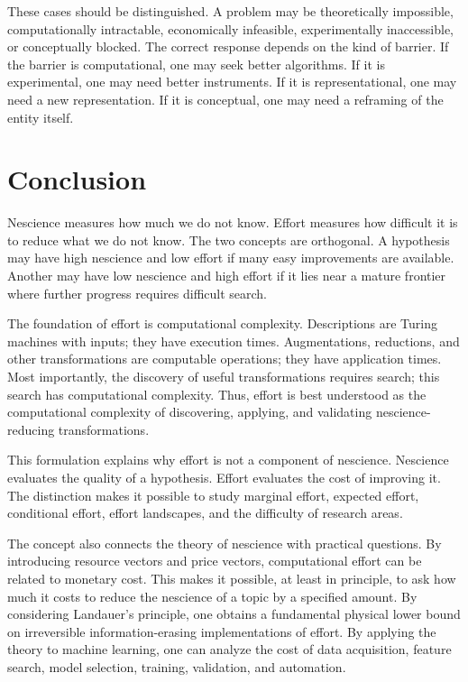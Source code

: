 These cases should be distinguished. A problem may be theoretically impossible, computationally intractable, economically infeasible, experimentally inaccessible, or conceptually blocked. The correct response depends on the kind of barrier. If the barrier is computational, one may seek better algorithms. If it is experimental, one may need better instruments. If it is representational, one may need a new representation. If it is conceptual, one may need a reframing of the entity itself.

\section{Conclusion}
\label{sec:effort_conclusion}

Nescience measures how much we do not know. Effort measures how difficult it is to reduce what we do not know. The two concepts are orthogonal. A hypothesis may have high nescience and low effort if many easy improvements are available. Another may have low nescience and high effort if it lies near a mature frontier where further progress requires difficult search.

The foundation of effort is computational complexity. Descriptions are Turing machines with inputs; they have execution times. Augmentations, reductions, and other transformations are computable operations; they have application times. Most importantly, the discovery of useful transformations requires search; this search has computational complexity. Thus, effort is best understood as the computational complexity of discovering, applying, and validating nescience-reducing transformations.

This formulation explains why effort is not a component of nescience. Nescience evaluates the quality of a hypothesis. Effort evaluates the cost of improving it. The distinction makes it possible to study marginal effort, expected effort, conditional effort, effort landscapes, and the difficulty of research areas.

The concept also connects the theory of nescience with practical questions. By introducing resource vectors and price vectors, computational effort can be related to monetary cost. This makes it possible, at least in principle, to ask how much it costs to reduce the nescience of a topic by a specified amount. By considering Landauer's principle, one obtains a fundamental physical lower bound on irreversible information-erasing implementations of effort. By applying the theory to machine learning, one can analyze the cost of data acquisition, feature search, model selection, training, validation, and automation.


